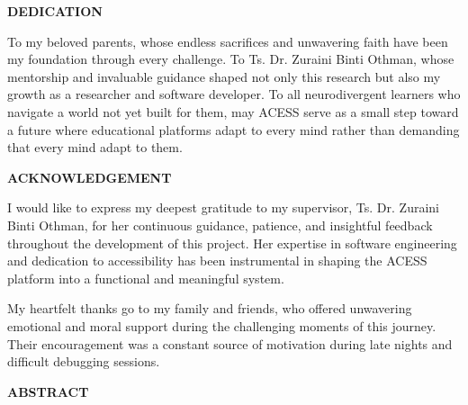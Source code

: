 \documentclass[12pt, oneside]{article} %
\begin{document}
\vfill \null

\newpage


\begin{center}
{}
\textbf{DEDICATION}
\end{center}

\vspace{1cm}
To my beloved parents, whose endless sacrifices and unwavering faith have been my foundation through every challenge. To Ts. Dr. Zuraini Binti Othman, whose mentorship and invaluable guidance shaped not only this research but also my growth as a researcher and software developer. To all neurodivergent learners who navigate a world not yet built for them, may ACESS serve as a small step toward a future where educational platforms adapt to every mind rather than demanding that every mind adapt to them.

\vfill \null

\newpage


\begin{center}
{}
\textbf{ACKNOWLEDGEMENT}
\end{center}

\vspace{1cm}
I would like to express my deepest gratitude to my supervisor, Ts. Dr. Zuraini Binti Othman, for her continuous guidance, patience, and insightful feedback throughout the development of this project. Her expertise in software engineering and dedication to accessibility has been instrumental in shaping the ACESS platform into a functional and meaningful system.

My heartfelt thanks go to my family and friends, who offered unwavering emotional and moral support during the challenging moments of this journey. Their encouragement was a constant source of motivation during late nights and difficult debugging sessions.

\vfill \null

\newpage


\begin{center}
\vfill \null
{}
{}
\textbf{ABSTRACT}
\end{center}
\end{document}

